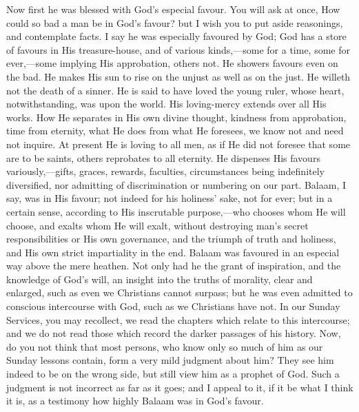 Now first he was blessed with God's especial favour. You will ask
at once, How could so bad a man be in God's favour? but I wish you to
put aside reasonings, and contemplate facts. I say he was especially
favoured by God; God has a store of favours in His treasure-house, and
of various kinds,—some for a time, some for ever,—some implying
His approbation, others not. He showers favours even on the bad. He
makes His sun to rise on the unjust as well as on the just. He willeth
not the death of a sinner. He is said to have loved the young ruler,
whose heart, notwithstanding, was upon the world. His loving-mercy
extends over all His works. How He separates in His own divine
thought, kindness from approbation, time from eternity, what He does
from what He foresees, we know not and need not inquire. At present He
is loving to all men, as if He did not foresee that some are to be
saints, others reprobates to all eternity. He dispenses His favours
variously,—gifts, graces, rewards, faculties, circumstances being
indefinitely diversified, nor admitting of discrimination or numbering
on our part. Balaam, I say, was in His favour; not indeed for his
holiness' sake, not for ever; but in a certain sense, according to His
inscrutable purpose,—who chooses whom He will choose, and exalts
whom He will exalt, without destroying man's secret responsibilities
or His own governance, and the triumph of truth and holiness, and His
own strict impartiality in the end. Balaam was favoured in an especial
way above the mere heathen. Not only had he the grant of inspiration,
and the knowledge of God's will, an insight into the truths of
morality, clear and enlarged, such as even we Christians cannot
surpass; but he was even admitted to conscious intercourse with God,
such as we Christians have not. In our Sunday Services, you may
recollect, we read the chapters which relate to this intercourse; and
we do not read those which record the darker passages of his history.
Now, do you not think that most persons, who know only so much of him
as our Sunday lessons contain, form a very mild judgment about him?
They see him indeed to be on the wrong side, but still view him as a
prophet of God. Such a judgment is not incorrect as far as it goes;
and I appeal to it, if it be what I think it is, as a testimony how
highly Balaam was in God's favour.

